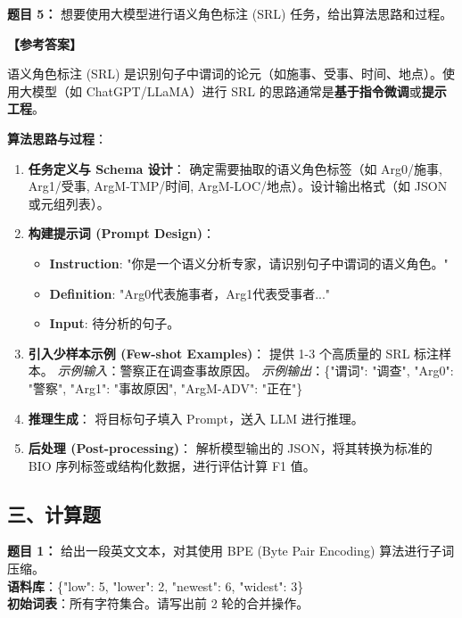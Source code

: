 \documentclass[a4paper,11pt]{article}
\newenvironment{question}[1]
    {\vspace{0.5cm}\noindent\textbf{题目 #1：}}
    {\vspace{0.2cm}}
\newenvironment{answer}
    {\noindent\textbf{【参考答案】}\par\small\color{blue}}
    {\par\vspace{0.5cm}\normalcolor}
\begin{document}
\begin{question}{5}
想要使用大模型进行语义角色标注 (SRL) 任务，给出算法思路和过程。
\end{question}

\begin{answer}
语义角色标注 (SRL) 是识别句子中谓词的论元（如施事、受事、时间、地点）。使用大模型（如 ChatGPT/LLaMA）进行 SRL 的思路通常是\textbf{基于指令微调}或\textbf{提示工程}。

\textbf{算法思路与过程}：
\begin{enumerate}
    \item \textbf{任务定义与 Schema 设计}：
    确定需要抽取的语义角色标签（如 Arg0/施事, Arg1/受事, ArgM-TMP/时间, ArgM-LOC/地点）。设计输出格式（如 JSON 或元组列表）。
    
    \item \textbf{构建提示词 (Prompt Design)}：
    \begin{itemize}
        \item \textbf{Instruction}: "你是一个语义分析专家，请识别句子中谓词的语义角色。"
        \item \textbf{Definition}: "Arg0代表施事者，Arg1代表受事者..."
        \item \textbf{Input}: 待分析的句子。
    \end{itemize}
    
    \item \textbf{引入少样本示例 (Few-shot Examples)}：
    提供 1-3 个高质量的 SRL 标注样本。
    \textit{示例输入}：警察正在调查事故原因。
    \textit{示例输出}：\{"谓词": "调查", "Arg0": "警察", "Arg1": "事故原因", "ArgM-ADV": "正在"\}
    
    \item \textbf{推理生成}：
    将目标句子填入 Prompt，送入 LLM 进行推理。
    
    \item \textbf{后处理 (Post-processing)}：
    解析模型输出的 JSON，将其转换为标准的 BIO 序列标签或结构化数据，进行评估计算 F1 值。
\end{enumerate}
\end{answer}

\subsection{三、计算题}

\begin{question}{1}
给出一段英文文本，对其使用 BPE (Byte Pair Encoding) 算法进行子词压缩。\\
\textbf{语料库}：\{"low": 5, "lower": 2, "newest": 6, "widest": 3\}\\
\textbf{初始词表}：所有字符集合。请写出前 2 轮的合并操作。
\end{question}
\end{document}
